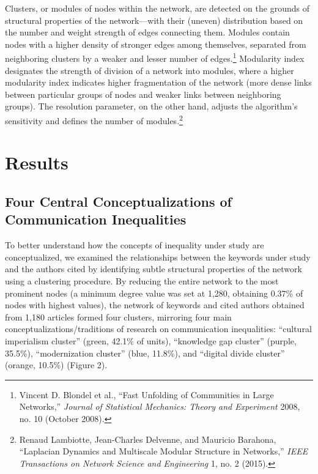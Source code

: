 \documentclass{tufte-handout}
\begin{document}
Clusters, or modules of nodes within the network, are detected on the
grounds of structural properties of the network---with their (uneven)
distribution based on the number and weight strength of edges connecting
them. Modules contain nodes with a higher density of stronger edges
among themselves, separated from neighboring clusters by a weaker and
lesser number of edges.\footnote{Vincent D. Blondel et al., ``Fast
  Unfolding of Communities in Large Networks,'' \emph{Journal of
  Statistical Mechanics: Theory and Experiment} 2008, no. 10 (October
  2008).} Modularity index designates the strength of division of a
network into modules, where a higher modularity index indicates higher
fragmentation of the network (more dense links between particular groups
of nodes and weaker links between neighboring groups). The resolution
parameter, on the other hand, adjusts the algorithm's sensitivity and
defines the number of modules.\footnote{Renaud Lambiotte, Jean-Charles
  Delvenne, and Mauricio Barahona, ``Laplacian Dynamics and Multiscale
  Modular Structure in Networks,'' \emph{IEEE Transactions on Network
  Science and Engineering} 1, no. 2 (2015).}

\hypertarget{results}{%
\section{Results}\label{results}}

\hypertarget{four-central-conceptualizations-of-communication-inequalities}{%
\subsection{Four Central Conceptualizations of
Communication
Inequalities}\label{four-central-conceptualizations-of-communication-inequalities}}

To better understand how the concepts of inequality under study are
conceptualized, we examined the relationships between the keywords under
study and the authors cited by identifying subtle structural properties
of the network using a clustering procedure. By reducing the entire
network to the most prominent nodes (a minimum degree value was set at
1,280, obtaining 0.37\% of nodes with highest values), the network of
keywords and cited authors obtained from 1,180 articles formed four
clusters, mirroring four main conceptualizations/traditions of research
on communication inequalities: ``cultural imperialism cluster'' (green,
42.1\% of units), ``knowledge gap cluster'' (purple, 35.5\%),
``modernization cluster'' (blue, 11.8\%), and ``digital divide cluster''
(orange, 10.5\%) (Figure 2).
\end{document}
